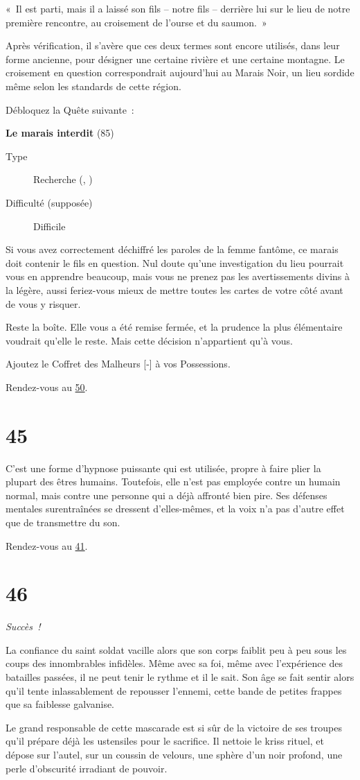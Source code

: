\documentclass{report}
\newcommand{\gsection}[1]{
    \section{#1}
    \label{section-#1}
}
\newcommand{\glink}[1]{\hyperref[section-#1]{#1}}
\newcommand{\quest}[5]{
    \begin{mdframed}[innertopmargin=0.5cm,innerbottommargin=0.5cm]
        \begin{center}
            \textbf{#1} (#2)
        \end{center}
        \begin{description}
            \item[Type] #3
            \item[Difficulté (supposée)] #4
        \end{description}
        #5
    \end{mdframed}
}
\newcommand{\success}{
    \emph{Succès !}
}
\begin{document}
« Il est parti, mais il a laissé son fils – notre fils – derrière lui sur le lieu de notre première rencontre, au croisement de l'ourse et du saumon. »

Après vérification, il s'avère que ces deux termes sont encore utilisés, dans leur forme ancienne, pour désigner une certaine rivière et une certaine montagne. Le croisement en question correspondrait aujourd'hui au Marais Noir, un lieu sordide même selon les standards de cette région.

Débloquez la Quête suivante :

\clearpage

\quest{Le marais interdit}{85}{Recherche (\ankh, \caduceus)}{Difficile}{
Si vous avez correctement déchiffré les paroles de la femme fantôme, ce marais doit contenir le fils en question. Nul doute qu'une investigation du lieu pourrait vous en apprendre beaucoup, mais vous ne prenez pas les avertissements divins à la légère, aussi feriez-vous mieux de mettre toutes les cartes de votre côté avant de vous y risquer.
}

Reste la boîte. Elle vous a été remise fermée, et la prudence la plus élémentaire voudrait qu'elle le reste. Mais cette décision n'appartient qu'à vous.

Ajoutez le Coffret des Malheurs [-] à vos Possessions. 

Rendez-vous au \glink{50}.

\gsection{45}

C'est une forme d'hypnose puissante qui est utilisée, propre à faire plier la plupart des êtres humains. Toutefois, elle n'est pas employée contre un humain normal, mais contre une personne qui a déjà affronté bien pire. Ses défenses mentales surentraînées se dressent d'elles-mêmes, et la voix n'a pas d'autre effet que de transmettre du son.

Rendez-vous au \glink{41}.

\gsection{46}

\success

La confiance du saint soldat vacille alors que son corps faiblit peu à peu sous les coups des innombrables infidèles. Même avec sa foi, même avec l'expérience des batailles passées, il ne peut tenir le rythme et il le sait. Son âge se fait sentir alors qu'il tente inlassablement de repousser l'ennemi, cette bande de petites frappes que sa faiblesse galvanise.

Le grand responsable de cette mascarade est si sûr de la victoire de ses troupes qu'il prépare déjà les ustensiles pour le sacrifice. Il nettoie le kriss rituel, et dépose sur l'autel, sur un coussin de velours, une sphère d'un noir profond, une perle d'obscurité irradiant de pouvoir.
\end{document}
